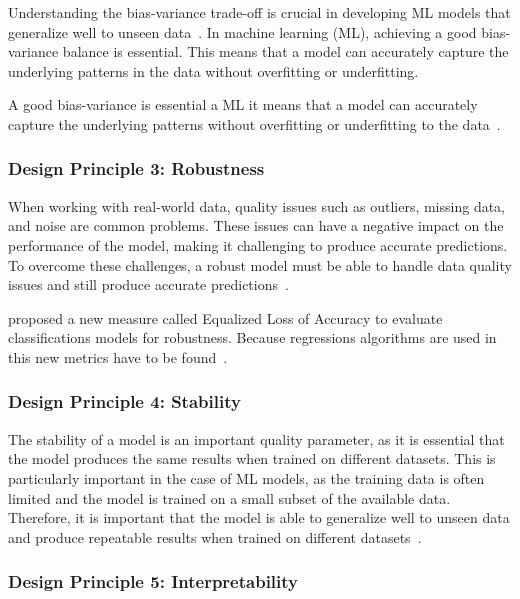 Understanding the bias-variance trade-off is crucial in developing \ac{ML} models that
generalize well to unseen data~\cite[p. 49--51]{zhou_machinelearning_2021}.
In machine learning (\ac{ML}), achieving a good bias-variance balance is essential.
This means that a model can accurately capture the underlying patterns in the data
without overfitting or underfitting.

A good bias-variance is essential a \ac{ML} it means that a model can
accurately capture the underlying patterns without overfitting or underfitting to the
data~\cite[p. 49--51]{zhou_machinelearning_2021}.

\subsubsection*{Design Principle 3: Robustness}

When working with real-world data, quality issues such as outliers, missing data, and
noise are common problems. These issues can have a negative impact on the performance
of the model, making it challenging to produce accurate predictions. To overcome these
challenges, a robust model must be able to handle data quality issues and still produce
accurate predictions~\cite[p. 16]{siebert2022construction}.

\cite{saez_evaluatingclassifierbehavior_2016} proposed a new measure called Equalized
Loss of Accuracy to evaluate classifications models for robustness.
Because regressions algorithms are used in this new metrics have to be found~\cite[p.
3]{saez_evaluatingclassifierbehavior_2016}.

\subsubsection*{Design Principle 4: Stability}

The stability of a model is an important quality parameter, as it is essential that
the model produces the same results when trained on different datasets.
This is particularly important in the case of \ac{ML} models, as the training data
is often limited and the model is trained on a small subset of the available data.
Therefore, it is important that the model is able to generalize well to unseen data and
produce repeatable results when trained on different datasets~\cite[p. 16]{
    siebert2022construction}.

\subsubsection*{Design Principle 5: Interpretability}

